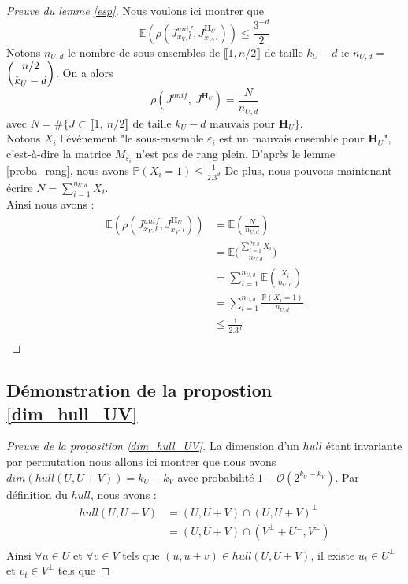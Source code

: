 \documentclass[12pt]{article}
\theoremstyle{plain}
\theoremstyle{definition}
\begin{document}
\begin{appendix}
\begin{proof}[Preuve du lemme \ref{esp}]
Nous voulons ici montrer que $$ \mathbb{E}\left(\rho\left(J_{x_V,l}^{unif},J_{x_V, l}^{\mathbf{H}_U}\right)\right) \leq \frac{3^{-d}}{2} $$
Notons $n_{U,d}$ le nombre de sous-ensembles de $\llbracket 1, n/2\rrbracket$ de taille $k_U-d$ ie \mbox{$n_{U,d} = $ {\scriptsize$\dbinom{n/2}{k_U-d}$}}. On a alors $$\rho(J^{unif},\ J^{\mathbf{H}_U}) = \frac{N}{n_{U,d}}$$ avec $N = \#\{J \subset \llbracket 1,\ n/2\rrbracket \text{ de taille } k_U - d \text{ mauvais pour } \mathbf{H}_U\}$.\\
Notons $X_i$ l'événement "le sous-ensemble $\varepsilon_i$ est un mauvais ensemble pour $\mathbf{H}_U$", c'est-à-dire la matrice $M_{\overline{\varepsilon_i}}$ n'est pas de rang plein. D'après le lemme \ref{proba_rang}, nous avons $\mathbb{P}(X_i = 1)\leq \frac{1}{2.3^d}$
De plus, nous pouvons maintenant écrire $N = \sum\limits_{i=1}^{n_{U,d}}X_i$.\\
Ainsi nous avons :
\begin{equation*}
\begin{split}
\mathbb{E}\left(\rho\left(J_{x_V,l}^{unif},J_{x_V, l}^{\mathbf{H}_U}\right)\right)  &= \mathbb{E}\left(\frac{N}{n_{U,d}}\right)  \\
&= \mathbb{E}\Bigg(\frac{\sum\limits_{i=1}^{n_{U,d}}X_i}{n_{U,d}}\Bigg)\\
&= \sum\limits_{i=1}^{n_{U,d}}\mathbb{E}\left(\frac{X_i}{n_{U,d}}\right)\\
&= \sum\limits_{i=1}^{n_{U,d}}\frac{\mathbb{P}(X_i = 1)}{n_{U,d}}\\
&\leq \frac{1}{2.3^d}\\
\end{split}
\end{equation*}
\end{proof}

\subsection*{Démonstration de la propostion \ref{dim_hull_UV}}
\begin{proof}[Preuve de la proposition \ref{dim_hull_UV}]
La dimension d'un $hull$ étant invariante par permutation nous allons ici montrer que nous avons $dim(hull(U,U+V)) = k_U - k_V$ avec probabilité $1-\mathcal{O}(2^{k_U-k_V})$.
Par définition du $hull$, nous avons :
\begin{equation*}
\begin{split}
hull(U,U+V) &= (U,U+V) \cap (U,U+V)^{\bot } \\
&= (U,U+V) \cap (V^{\bot}+U^{\bot}, V^{\bot}) \\
\end{split}
\end{equation*} 
Ainsi $\forall u\in U$ et $\forall v\in V$ tels que $(u,u+v)\in hull(U,U+V)$, il existe $u_t\in U^{\bot}$ et $v_t\in V^{\bot}$ tels que


\end{proof}
\end{appendix}
\end{document}
